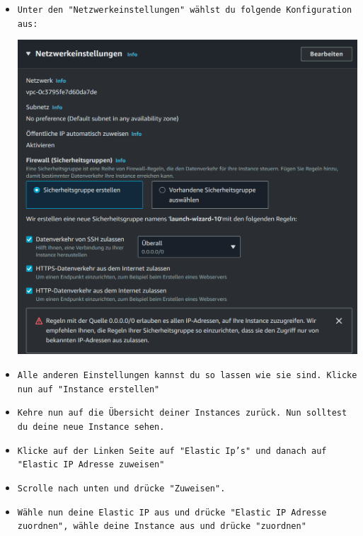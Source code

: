 \documentclass{article}
\begin{document}
\begin{itemize}
\item \texttt{Unter den "Netzwerkeinstellungen" wählst du folgende Konfiguration aus: 
} \\
\begin{center}
    \includegraphics[width=13cm]{images/nextcloud_2.png}
\end{center}

\item \texttt{Alle anderen Einstellungen kannst du so lassen wie sie sind. Klicke nun auf "Instance erstellen"} \\

\clearpage

\item \texttt{Kehre nun auf die Übersicht deiner Instances zurück. Nun solltest du deine neue Instance sehen.} \\

\item \texttt{Klicke auf der Linken Seite auf "Elastic Ip's" und danach auf "Elastic IP Adresse zuweisen"} \\

\item \texttt{Scrolle nach unten und drücke "Zuweisen".} \\

\item \texttt{Wähle nun deine Elastic IP aus und drücke "Elastic IP Adresse zuordnen", wähle deine Instance aus und drücke "zuordnen"} \\


\end{itemize}
\end{document}
